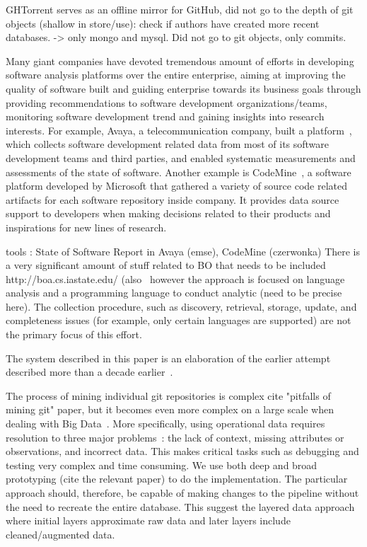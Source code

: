 \documentclass[conference]{IEEEtran}
\begin{document}
GHTorrent serves as an offline mirror for GitHub, did not go to the depth of git objects (shallow in store/use): check if authors have 
 created more recent databases. -> only mongo and mysql. Did not go to git objects, only commits.

Many giant companies have devoted tremendous amount of efforts in developing software analysis platforms over the entire enterprise, aiming at improving the quality of software built and guiding enterprise towards its business goals through providing recommendations to software development organizations/teams, monitoring software development trend and gaining insights into research interests. For example, Avaya, a telecommunication company, built a platform~\cite{HMPQ10}, which collects software development related data from most of its software development teams and third parties, and enabled systematic measurements and assessments of the state of software. Another example is CodeMine~\cite{czerwonka2013codemine}, a software platform developed by Microsoft that gathered a variety of source code related artifacts for each software repository inside company. It provides data source support to developers when making decisions related to their products and inspirations for new lines of research.

tools : State of Software Report in Avaya (emse), CodeMine (czerwonka)
There is a very significant amount of stuff related to BO that needs to be included 
http://boa.cs.iastate.edu/ (also~\cite{TaRe}
however the approach is focused on language analysis and a programming language to conduct analytic (need to be precise here). The collection 
procedure, such as discovery, retrieval, storage, update, and completeness issues (for example, only certain languages are supported) are not the primary focus of this effort. 

The system described in this paper is an elaboration of the earlier attempt described more than a decade earlier~\cite{M09msr,M07}.

The process of mining individual git repositories is complex 
cite "pitfalls of mining git" paper, but it becomes even more 
complex on a large scale when dealing with Big Data~\cite{gorton2016software}. More specifically, using operational data requires resolution to three major problems~\cite{M14}: the lack of 
context, missing attributes or observations, and incorrect data. This makes critical tasks such as debugging and testing very complex and time consuming. We use both deep and broad prototyping (cite the relevant paper) to do the implementation. The particular approach should, therefore, be capable of making changes to the pipeline without the need to recreate the entire database. This suggest the layered data approach where initial layers approximate raw data and later layers include cleaned/augmented data. 
\end{document}
